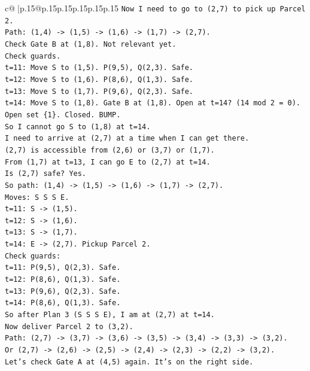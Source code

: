 \documentclass{article}
\begin{document}
{\begin{supertabular}{c@{$\;$}|p{.15\linewidth}@{}p{.15\linewidth}p{.15\linewidth}p{.15\linewidth}p{.15\linewidth}p{.15\linewidth}}
{{{\texttt{Now I need to go to (2,7) to pick up Parcel 2.} \\
\texttt{Path: (1,4) {-}> (1,5) {-}> (1,6) {-}> (1,7) {-}> (2,7).} \\
\texttt{Check Gate B at (1,8). Not relevant yet.} \\
\texttt{Check guards.} \\
\texttt{t=11: Move S to (1,5). P(9,5), Q(2,3). Safe.} \\
\texttt{t=12: Move S to (1,6). P(8,6), Q(1,3). Safe.} \\
\texttt{t=13: Move S to (1,7). P(9,6), Q(2,3). Safe.} \\
\texttt{t=14: Move S to (1,8). Gate B at (1,8). Open at t=14? (14 mod 2 = 0). Open set \{1\}. Closed. BUMP.} \\
\texttt{So I cannot go S to (1,8) at t=14.} \\
\texttt{I need to arrive at (2,7) at a time when I can get there.} \\
\texttt{(2,7) is accessible from (2,6) or (3,7) or (1,7).} \\
\texttt{From (1,7) at t=13, I can go E to (2,7) at t=14.} \\
\texttt{Is (2,7) safe? Yes.} \\
\texttt{So path: (1,4) {-}> (1,5) {-}> (1,6) {-}> (1,7) {-}> (2,7).} \\
\texttt{Moves: S S S E.} \\
\texttt{t=11: S {-}> (1,5).} \\
\texttt{t=12: S {-}> (1,6).} \\
\texttt{t=13: S {-}> (1,7).} \\
\texttt{t=14: E {-}> (2,7). Pickup Parcel 2.} \\
\texttt{Check guards:} \\
\texttt{t=11: P(9,5), Q(2,3). Safe.} \\
\texttt{t=12: P(8,6), Q(1,3). Safe.} \\
\texttt{t=13: P(9,6), Q(2,3). Safe.} \\
\texttt{t=14: P(8,6), Q(1,3). Safe.} \\
\texttt{So after Plan 3 (S S S E), I am at (2,7) at t=14.} \\
\texttt{Now deliver Parcel 2 to (3,2).} \\
\texttt{Path: (2,7) {-}> (3,7) {-}> (3,6) {-}> (3,5) {-}> (3,4) {-}> (3,3) {-}> (3,2).} \\
\texttt{Or (2,7) {-}> (2,6) {-}> (2,5) {-}> (2,4) {-}> (2,3) {-}> (2,2) {-}> (3,2).} \\
\texttt{Let's check Gate A at (4,5) again. It's on the right side.} \\
}}}
\end{supertabular}}
\end{document}
